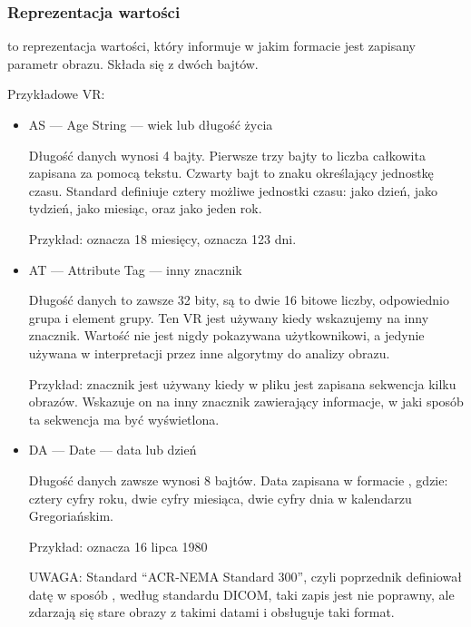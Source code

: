 \subsubsection{Reprezentacja wartości}
\label{sec:dicom-vr}

 to reprezentacja wartości, który informuje w jakim formacie jest zapisany parametr obrazu.
Składa się z dwóch bajtów.

Przykładowe VR:
\begin{itemize}
    \item AS --- Age String --- wiek lub długość życia

          Długość danych wynosi 4 bajty.
          Pierwsze trzy bajty to liczba całkowita zapisana za pomocą tekstu.
          Czwarty bajt to znaku określający jednostkę czasu.
          Standard definiuje cztery możliwe jednostki czasu:  jako dzień,  jako tydzień,  jako miesiąc, oraz  jako jeden rok.

          Przykład:  oznacza 18 miesięcy,  oznacza 123 dni.

    \item AT --- Attribute Tag --- inny znacznik

          Długość danych to zawsze 32 bity, są to dwie 16 bitowe liczby, odpowiednio grupa i element grupy.
          Ten VR jest używany kiedy wskazujemy na inny znacznik.
          Wartość nie jest nigdy pokazywana użytkownikowi, a jedynie używana w interpretacji przez inne algorytmy do analizy obrazu.

          Przykład: znacznik  jest używany kiedy w pliku jest zapisana sekwencja kilku obrazów.
          Wskazuje on na inny znacznik zawierający informacje, w jaki sposób ta sekwencja ma być wyświetlona.

    \item DA --- Date --- data lub dzień

          Długość danych zawsze wynosi 8 bajtów.
          Data zapisana w formacie , gdzie:  cztery cyfry roku,  dwie cyfry miesiąca,  dwie cyfry dnia w kalendarzu Gregoriańskim.

          Przykład:  oznacza 16 lipca 1980

          UWAGA: Standard \enquote{ACR-NEMA Standard 300}, czyli poprzednik \DICOM definiował datę w sposób , według standardu DICOM, taki zapis jest nie poprawny, ale zdarzają się stare obrazy z takimi datami i  obsługuje taki format.


\end{itemize}
